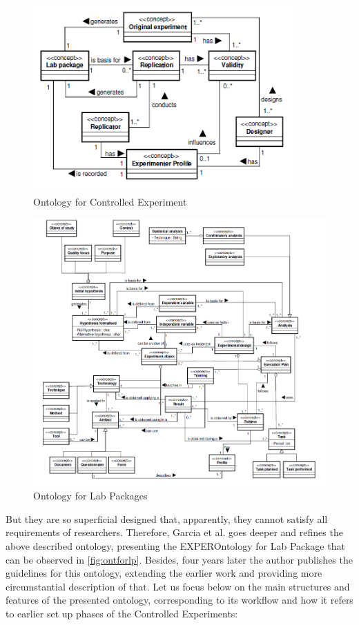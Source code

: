 	\begin{figure}
		\centering
		\includegraphics[width=10cm]{images/OntforCE.PNG}
		\caption{Ontology for Controlled Experiment\cite{Gar08}}
		\label{fig:ontforce}
	\end{figure}
	\begin{figure}
		\centering
		\includegraphics[width=18cm]{images/OntforLP.PNG}
		\caption{Ontology for Lab Packages\cite{Gar08}}
		\label{fig:ontforlp}
	\end{figure}
	But they are so superficial designed that, apparently, they cannot satisfy all requirements of researchers. Therefore, Garcia et al. goes deeper and refines the above described ontology,  presenting the EXPEROntology for Lab Package that can be observed in \autoref{fig:ontforlp}. Besides, four years later the author publishes the guidelines for this ontology\cite{Gar11}, extending the earlier work and providing more circumstantial description of that. Let us focus below on the main structures and features of the presented ontology, corresponding to its workflow and how it refers to earlier set up phases of the Controlled Experiments:
